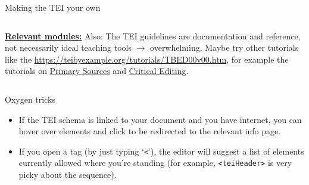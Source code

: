\begin{frame}{Making the TEI your own}
\begin{columns}
\begin{block}{\href{https://tei-c.org/release/doc/tei-p5-doc/en/html/index.html}{\textbf{Relevant modules:}}}
Also: The TEI guidelines are documentation and reference, not necessarily ideal teaching tools $\to$ overwhelming. Maybe try other tutorials like the \href{TEI by example page}{https://teibyexample.org/tutorials/TBED00v00.htm}, for example the tutorials on \href{https://teibyexample.org/tutorials/TBED06v00.htm}{\alert{Primary Sources}} and \href{https://teibyexample.org/tutorials/TBED07v00.htm}{\alert{Critical Editing}}.
\end{block}
\end{columns}


\begin{block}{Oxygen tricks}
\begin{itemize}\normalsize
    \item If the TEI schema is linked to your document and you have internet, you can hover over elements and click to be redirected to the relevant info page. 
    \item If you open a tag (by just typing `\texttt{<}'), the editor will suggest a list of elements currently allowed where you're standing (for example, \texttt{<teiHeader>} is very picky about the sequence).
\end{itemize}
\end{block}

\end{frame}

